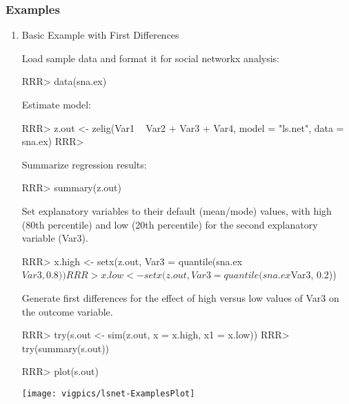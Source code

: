 \subsubsection{Examples}
\begin{enumerate}
\item Basic Example with First Differences 

Load sample data and format it for social networkx analysis:
\begin{Schunk}
\begin{Sinput}
RRR>  data(sna.ex)
\end{Sinput}
\end{Schunk}
Estimate model:
\begin{Schunk}
\begin{Sinput}
RRR>  z.out <- zelig(Var1 ~ Var2 + Var3 + Var4, model = "ls.net", data = sna.ex)
RRR> 
\end{Sinput}
\end{Schunk}

Summarize regression results:
\begin{Schunk}
\begin{Sinput}
RRR>  summary(z.out)
\end{Sinput}
\end{Schunk}

Set explanatory variables to their default (mean/mode) values, with
high (80th percentile) and low (20th percentile) for the second
explanatory variable (Var3).
\begin{Schunk}
\begin{Sinput}
RRR>  x.high <- setx(z.out, Var3 = quantile(sna.ex$Var3, 0.8))
RRR>  x.low <- setx(z.out, Var3 = quantile(sna.ex$Var3, 0.2))
\end{Sinput}
\end{Schunk}
Generate first differences for the effect of high versus low values of
Var3 on the outcome variable.
\begin{Schunk}
\begin{Sinput}
RRR>  try(s.out <- sim(z.out, x = x.high, x1 = x.low))
RRR>  try(summary(s.out))
\end{Sinput}
\end{Schunk}
\begin{center}
\begin{Schunk}
\begin{Sinput}
RRR>  plot(s.out)
\end{Sinput}
\end{Schunk}
\texttt{[image: vigpics/lsnet-ExamplesPlot]}
\end{center}
\end{enumerate}

